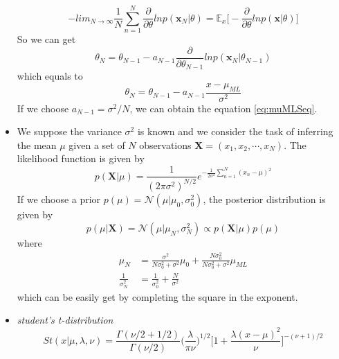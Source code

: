 \documentclass[12pt, a4paper]{article}
\newcommand{\E}{\mathbb{E}}
\begin{document}
\begin{itemize}
        \begin{equation*}
            -lim_{N\rightarrow\infty}\frac{1}{N}\sum_{n=1}^N\frac{\partial}{\partial{\theta}}
            lnp(\bm{x}_N|\theta)=\E_x\Big\lbrack-\frac{\partial}{\partial{\theta}}lnp(\bm{x}|\theta)
            \Big\rbrack
        \end{equation*}
        So we can get
        \begin{equation}
            \theta_N=\theta_{N-1}-a_{N-1}\frac{\partial}{\partial{\theta_{N-1}}}lnp(\bm{x}_N|\theta_{N-1})
        \end{equation}
        which equals to
        \begin{equation*}
            \theta_N=\theta_{N-1}-a_{N-1}\frac{x-\mu_{ML}}{\sigma^2}
        \end{equation*}
        If we choose $a_{N-1}=\sigma^2/N$, we can obtain the equation \ref{eq:muMLSeq}.
        \item We suppose the variance $\sigma^2$ is known and we consider the task of inferring the mean 
        $\mu$ given a set of $N$ observations $\bm{X}=(x_1,x_2,\cdots,x_N)$. The likelihood function is 
        given by
        \begin{equation*}
            p(\bm{X}|\mu)=\frac{1}{(2\pi\sigma^2)^{N/2}}e^{-\frac{1}{2\sigma^2}\sum_{n=1}^N(x_n-\mu)^2}
        \end{equation*}
        If we choose a prior $p(\mu)=\mathcal{N}(\mu|\mu_0,\sigma_0^2)$, the posterior distribution is 
        given by
        \begin{equation*}
            p(\mu|\bm{X})=\mathcal{N}(\mu|\mu_N,\sigma_N^2)\propto p(\bm{X}|\mu)p(\mu)
        \end{equation*}
        where
        \begin{align*}
            \mu_N&=\frac{\sigma^2}{N\sigma_0^2+\sigma^2}\mu_0+\frac{N\sigma_0^2}{N\sigma_0^2+\sigma^2}
            \mu_{ML}\\
            \frac{1}{\sigma_N^2}&=\frac{1}{\sigma_0^2}+\frac{N}{\sigma^2}
        \end{align*}
        which can be easily get by completing the square in the exponent.
        \item \textit{student's t-distribution}
        \begin{equation}
            St(x|\mu,\lambda,\nu)=\frac{\Gamma(\nu/2+1/2)}{\Gamma(\nu/2)}\Big(\frac{\lambda}{\pi\nu}
            \Big)^{1/2}\Big\lbrack 1+\frac{\lambda(x-\mu)^2}{\nu}\Big\rbrack^{-(\nu+1)/2}
        \end{equation}

\end{itemize}
\end{document}
